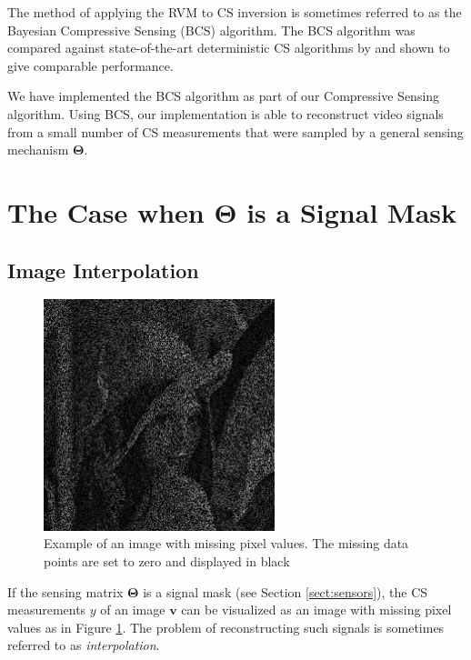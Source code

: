 The method of applying the RVM to CS inversion is sometimes referred to as the Bayesian Compressive Sensing (BCS) algorithm.
The BCS algorithm was compared against state-of-the-art deterministic CS algorithms by \cite{ji2008,pilikos2014} and shown to give comparable performance.

We have implemented the BCS algorithm as part of our Compressive Sensing algorithm.
Using BCS, our implementation is able to reconstruct video signals from a small number of CS measurements that were sampled by a general sensing mechanism $\bm\Theta$. 


\section{The Case when \texorpdfstring{$\bm\Theta$}{[Theta]} is a Signal Mask}

\subsection{Image Interpolation}
\begin{figure}
  \centering
  \includegraphics[width=0.6\textwidth]{Chapter5/Images/lenna_MASKED.png}
  \caption[Example of masked image signal]{Example of an image with missing pixel values. The missing data points are set to zero and displayed in black}
  \label{fig:lenna_mask}
\end{figure}

If the sensing matrix $\bm\Theta$ is a signal mask (see Section \ref{sect:sensors}), the CS measurements $y$ of an image $\bm v$ can be visualized as an image with missing pixel values as in Figure \ref{fig:lenna_mask}.
The problem of reconstructing such signals is sometimes referred to as \emph{interpolation}.

